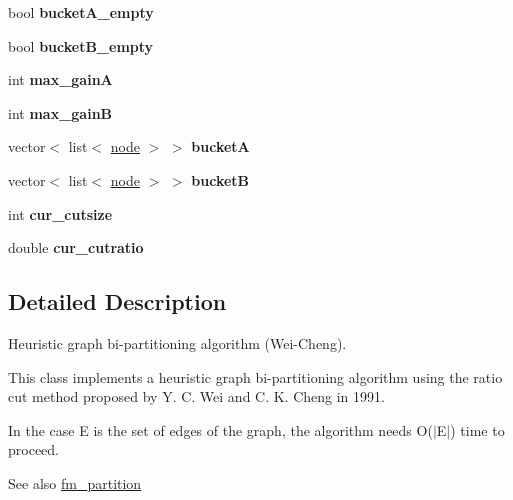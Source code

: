 \begin{DoxyCompactItemize}
bool {\bfseries bucket\+A\+\_\+empty}
\item 
\mbox{\label{classratio__cut__partition_af4bbd571d19340f92519240b96b52702}} 
bool {\bfseries bucket\+B\+\_\+empty}
\item 
\mbox{\label{classratio__cut__partition_ae69ef6876be68d5752d247564a524c6a}} 
int {\bfseries max\+\_\+gainA}
\item 
\mbox{\label{classratio__cut__partition_af184ffdb46e49b1fc95faa1e6a91cc8e}} 
int {\bfseries max\+\_\+gainB}
\item 
\mbox{\label{classratio__cut__partition_ae344fc28ce1d559c793bc7cc113843b6}} 
vector$<$ list$<$ \mbox{\hyperlink{classnode}{node}} $>$ $>$ {\bfseries bucketA}
\item 
\mbox{\label{classratio__cut__partition_abf8e49d7032714f10aac12cf635dcf77}} 
vector$<$ list$<$ \mbox{\hyperlink{classnode}{node}} $>$ $>$ {\bfseries bucketB}
\item 
\mbox{\label{classratio__cut__partition_aa01f2d6257fff28739e2431fe826ef71}} 
int {\bfseries cur\+\_\+cutsize}
\item 
\mbox{\label{classratio__cut__partition_a9dad324884cef5bcdd50122fc98e0860}} 
double {\bfseries cur\+\_\+cutratio}
\end{DoxyCompactItemize}


\subsection{Detailed Description}
Heuristic graph bi-\/partitioning algorithm (Wei-\/\+Cheng). 

This class implements a heuristic graph bi-\/partitioning algorithm using the ratio cut method proposed by Y. C. Wei and C. K. Cheng in 1991.

In the case E is the set of edges of the graph, the algorithm needs {\ttfamily O($\vert$\+E$\vert$)} time to proceed.

\begin{DoxySeeAlso}{See also}
\mbox{\hyperlink{classfm__partition}{fm\+\_\+partition}} 
\end{DoxySeeAlso}


